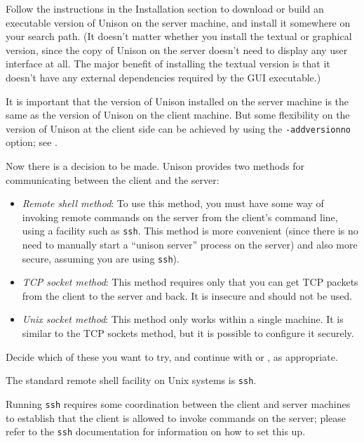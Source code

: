 \documentclass{article}
\begin{document}
Follow the instructions in the Installation section to download or
build an executable version of Unison on the server machine, and
install it somewhere on your search path.  (It doesn't matter whether
you install the textual or graphical version, since the copy of Unison on
the server doesn't need to display any user interface at all.  The major
benefit of installing the textual version is that it doesn't have any external
dependencies required by the GUI executable.)

It is important that the version of Unison installed on the server
machine is the same as the version of Unison on the client machine.
But some flexibility on the version of Unison at the client side can
be achieved by using the \verb|-addversionno| option; see
.

Now there is a decision to be made.  Unison provides two methods for
communicating between the client and the server:
\begin{itemize}
\item {\em Remote shell method}: To use this method, you must have
  some way of invoking remote commands on the server from the client's
  command line, using a facility such as \verb|ssh|.
  This method is more convenient (since there is no need to manually
  start a ``unison server'' process on the server) and also more
  secure, assuming you are using \verb|ssh|).

\item {\em TCP socket method}: This method requires only that you can
  get TCP packets from the client to the server and back.  It is
  insecure and should not be used.

\item {\em Unix socket method}: This method only works within a
  single machine.  It is similar to the TCP sockets method, but it is
  possible to configure it securely.
\end{itemize}

Decide which of these you want to try, and continue with
 or
, as appropriate.



The standard remote shell facility on Unix systems is \verb|ssh|.

Running
\verb|ssh| requires some coordination between the client and server
machines to establish that the client is allowed to invoke commands on
the server; please refer to the \verb|ssh| documentation
for information on how to set this up.
\end{document}
